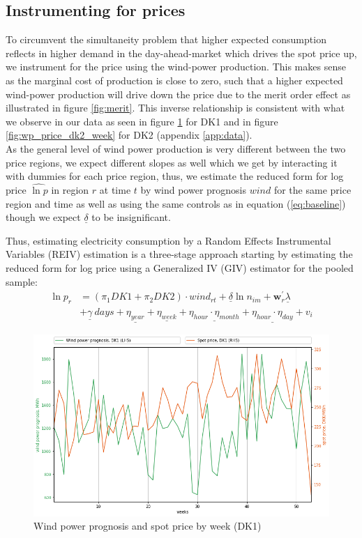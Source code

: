 \subsection{Instrumenting for prices}
\label{subsec:e_instrumenting}
To circumvent the simultaneity problem that higher expected consumption reflects in higher demand in the day-ahead-market which drives the spot price up, we instrument for the price using the wind-power production. This makes sense as the marginal cost of production is close to zero, such that a higher expected wind-power production will drive down the price due to the merit order effect as illustrated in figure \ref{fig:merit}. This inverse relationship is consistent with what we observe in our data as seen in figure \ref{fig:wp_price_dk1_week} for DK1 and in figure \ref{fig:wp_price_dk2_week} for DK2 (appendix \ref{app:data}).
\medskip\\
As the general level of wind power production is very different between the two price regions, we expect different slopes as well which we get by interacting it with dummies for each price region, thus, we estimate the reduced form for log price $\widehat{\ln p}$ in region $r$ at time $t$ by wind power prognosis $wind$ for the same price region and time as well as using the same controls as in equation (\ref{eq:baseline}) though we expect $\underline{\delta}$ to be insignificant.
\par
Thus, estimating electricity consumption by a Random Effects Instrumental Variables (REIV) estimation is a three-stage approach starting by estimating the reduced form for log price using a Generalized IV (GIV) estimator for the pooled sample:
\begin{equation}
  \label{eq:reduced}
  \begin{split}
    \ln p_{r} &= (\pi_1 DK1+\pi_2 DK2)\cdot wind_{rt} +\underline{\delta}\ln n_{im}+\bm{w}^{'}_{r}\underline{\lambda}\\
  &+\underline{\gamma}\ days+\underline{\eta_{year}}+\underline{\eta_{week}}+\underline{\eta_{hour}\cdot\eta_{month}}+\underline{\eta_{hour}\cdot\eta_{day}}+v_{i}
  \end{split}
\end{equation}
\vspace{-1em}
\begin{figure}[H]
  \centering
  \caption{Wind power prognosis and spot price by week (DK1)}
  \label{fig:wp_price_dk1_week}
    \includegraphics[width=1 \textwidth]{03_figures/wp_DK1_weeks}
\end{figure}
